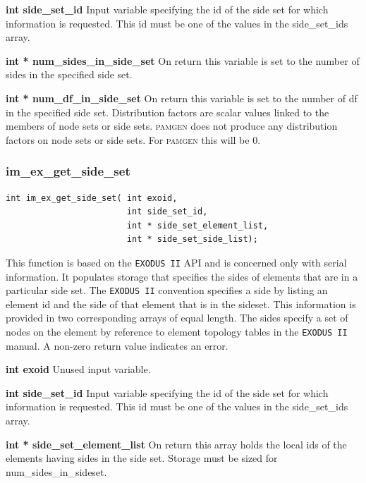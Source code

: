 {\setlength{\parindent}{0pt}
 \textbf{int side\_set\_id}  Input variable specifying the id of the side set for which information is requested. This id must be one of the values in the side\_set\_ids array.}

{\setlength{\parindent}{0pt}
 \textbf{int * num\_sides\_in\_side\_set}  On return this variable is set to the number of sides in the specified side set.}

{\setlength{\parindent}{0pt}
 \textbf{int * num\_df\_in\_side\_set}  On return this variable is set to the number of df in the specified side set.  Distribution factors are scalar values linked to the members of node sets or side sets. \textsc{pamgen} does not produce any distribution factors on node sets or side sets. For \textsc{pamgen} this will be 0.}




\subsubsection{im\_ex\_get\_side\_set}
{\ttfamily  \begin{verbatim}
int im_ex_get_side_set( int exoid,
                        int side_set_id,
                        int * side_set_element_list,
                        int * side_set_side_list);
\end{verbatim}}
This function is based on the \texttt{EXODUS II} API and is concerned only with serial information. It populates storage that specifies the sides of elements that are in a particular side set. The \texttt{EXODUS II} convention specifies a side by listing an element id and the side of that element that is in the sideset. This information is provided in two corresponding arrays of equal length. The sides specify a set of nodes on the element by reference to element topology tables in the \texttt{EXODUS II} manual. A non-zero return value indicates an error.

{\setlength{\parindent}{0pt}
 \textbf{int exoid} Unused input variable.}

{\setlength{\parindent}{0pt}
 \textbf{int side\_set\_id}  Input variable specifying the id of the side set for which information is requested. This id must be one of the values in the side\_set\_ids array.}

{\setlength{\parindent}{0pt}
 \textbf{int * side\_set\_element\_list}  On return this array holds the local ids of the elements having sides in the side set.  Storage must be sized for num\_sides\_in\_sideset.}

